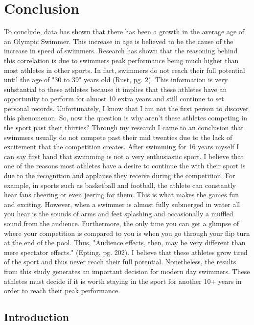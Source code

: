 \documentclass[letterpaper, 10 pt, conference]{ieeeconf}  %
\begin{document}
\section{Conclusion}
To conclude, data has shown that there has been a growth in the average age of an Olympic Swimmer. This increase in age is believed to be the cause of the increase in speed of swimmers. Research has shown that the reasoning behind this correlation is due to swimmers peak performance being much higher than most athletes in other sports. In fact, swimmers do not reach their full potential until the age of "30 to 39" years old (Rust, pg. 2). This information is very substantial to these athletes because it implies that these athletes have an opportunity to perform for almost 10 extra years and still continue to set personal records. Unfortunately, I know that I am not the first person to discover this phenomenon. So, now the question is why aren't these athletes competing in the sport past their thirties? Through my research I came to an conclusion that swimmers usually do not compete past their mid twenties due to the lack of excitement that the competition creates. After swimming for 16 years myself I can say first hand that swimming is not a very enthusiastic sport. I believe that one of the reasons most athletes have a desire to continue the with their sport is due to the recognition and applause they receive during the competition. For example, in sports such as basketball and football, the athlete can constantly hear fans cheering or even jeering for them. This is what makes the games fun and exciting. However, when a swimmer is almost fully submerged in water all you hear is the sounds of arms and feet splashing and occasionally a muffled sound from the audience. Furthermore, the only time you can get a glimpse of where your competition is compared to you is when you go through your flip turn at the end of the pool. Thus, "Audience effects, then, may be very different than mere spectator effects." (Epting, pg. 202). I believe that these athletes grow tired of the sport and thus never reach their full potential. Nonetheless, the results from this study generates an important decision for modern day swimmers. These athletes must decide if it is worth staying in the sport for another 10+ years in order to reach their peak performance.   





\clearpage

\appendix
\subsection{Introduction}
\end{document}
